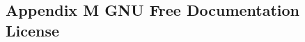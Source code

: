 \documentclass[class=book, crop=false]{standalone}
\begin{document}
\begin{CJK}{UTF8}{gbsn}

\chapter*{Appendix M GNU Free Documentation License}



\cleardoublepage

\end{CJK}
\end{document}
